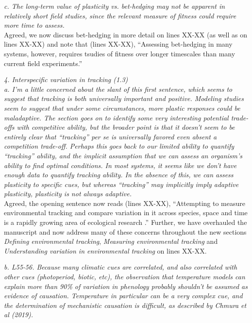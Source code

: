 \documentclass[11pt]{article}
\begin{document}
\emph{c.      The long-term value of plasticity vs. bet-hedging may not be apparent in relatively
short field studies, since the relevant measure of fitness could require more time to assess.}\\

Agreed, we now discuss bet-hedging in more detail on lines XX-XX (as well as on lines XX-XX) and note that (lines XX-XX), ``Assessing bet-hedging in many systems, however, requires tsudies of fitness over longer timescales than many current field experiments.''

\emph{4.       Interspecific variation in tracking (1.3) \\
a.      I’m a little concerned about the slant of this first sentence, which seems to suggest
that tracking is both universally important and positive. Modeling studies seem to suggest
that under some circumstances, more plastic responses could be maladaptive.  The section goes
on to identify some very interesting potential trade-offs with competitive ability, but the
broader point is that it doesn’t seem to be entirely clear that ``tracking'' per se is
universally favored even absent a competition trade-off. Perhaps this goes back to our
limited ability to quantify ``tracking'' ability, and the implicit assumption that we can
assess an organism's ability to find optimal conditions. In most systems, it seems like we
don’t have enough data to quantify tracking ability. In the absence of this, we can assess
plasticity to specific cues, but whereas “tracking” may implicitly imply adaptive plasticity,
plasticity is not always adaptive.}\\

Agreed, the opening sentence now reads (lines XX-XX), ``Attempting to measure environmental tracking and compare variation in it across species, space and time is a rapidly growing area of ecological research \citep[e.g.,]{Cook:2012pnas,fu2015,thackeray2016,cohen2018}.'' Further, we have overhauled the manuscript and now address many of these concerns throughout the new sections \emph{Defining environmental tracking}, \emph{Measuring environmental tracking} and \emph{Understanding variation in environmental tracking} on lines XX-XX. 

\emph{b.      L55-56. Because many climatic cues are correlated, and also correlated with other
cues (photoperiod, biotic, etc), the observation that temperature models can explain more
than 90\% of variation in phenology probably shouldn’t be assumed as evidence of causation.
Temperature in particular can be a very complex cue, and the determination of mechanistic
causation is difficult, as described by Chmura et al (2019).}\\
\end{document}
